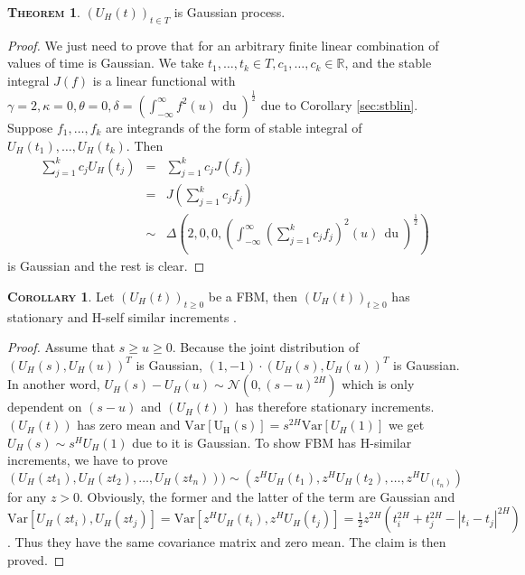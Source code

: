 \documentclass[a4paper, twoside, 11pt]{article}
\theoremstyle{definition}
\newtheorem{theorem}[definition]{\scshape Theorem}
\newtheorem{corollary}[definition]{\scshape Corollary}
\begin{document}
\begin{theorem}
  $(U_H(t))_{t\in T}$ is Gaussian process.
\end{theorem}

\begin{proof}
  We just need to prove that for an arbitrary finite linear combination of values of time is Gaussian. We take $t_1, \dots, t_k \in T, c_1, \dots, c_k \in \mathbb{R}$, and the stable integral $J(f) $ is a linear functional with $\gamma=2, \kappa=0, \theta=0, \delta= (\int_{-\infty}^{\infty}f^2(u)\,\mathop{du})^{\frac{1}{2}}$ due to Corollary \ref{sec:stblin}. Suppose $f_1,\dots, f_k$ are integrands of the form of stable integral of $U_H(t_1), \dots, U_H(t_k)$. Then 
  \begin{eqnarray*}
	\sum_{j=1}^k c_jU_H(t_j) &=& \sum_{j=1}^k c_jJ(f_j)\\
	&=& J(\sum_{j=1}^k c_jf_j)\\
	&\sim& \Delta(2, 0, 0, (\int_{-\infty}^{\infty}(\sum_{j=1}^k c_jf_j)^2(u)\,\mathop{du})^{\frac{1}{2}})
  \end{eqnarray*}
  is Gaussian and the rest is clear.
\end{proof}

\begin{corollary}
  Let $(U_H(t))_{t\ge 0}$ be a FBM, then $(U_H(t))_{t\ge 0}$ has stationary and H-self similar increments . 
\end{corollary}
\begin{proof}

 Assume that $s \ge u \ge 0 $. Because the joint distribution of $(U_H(s), U_H(u))^T$ is Gaussian, $(1, -1) \cdot (U_H(s), U_H(u))^T $ is Gaussian. In another word,  $U_H(s) - U_H(u) \sim \mathcal{N}(0, (s-u)^{2H})$ which is only dependent on $(s-u)$ and $(U_H(t))$ has therefore stationary increments.\\
   $(U_H(t))$ has zero mean and $\mathrm{Var[U_H(s)]} = s^{2H}\mathrm{Var}[U_H(1)]$ we get $U_H(s) \sim s^HU_H(1)$ due to it is Gaussian.
   To show FBM has H-similar increments, we have to prove\\ $(U_H(zt_1), U_H(zt_2),\dots, U_H(zt_n))) \sim (z^HU_H(t_1), z^HU_H(t_2),\dots, z^HU_(t_n))$ for any $z > 0$. Obviously, the former and the latter of the term are Gaussian and $\mathrm{Var}[U_H(zt_i), U_H(zt_j)] = \mathrm{Var}[z^HU_H(t_i), z^HU_H(t_j)] = \frac{1}{2}z^{2H}(t_i^{2H} + t_j^{2H} - |t_i-t_j|^{2H})$. Thus they have the same covariance matrix and zero mean. The claim is then proved.
\end{proof}
\end{document}
